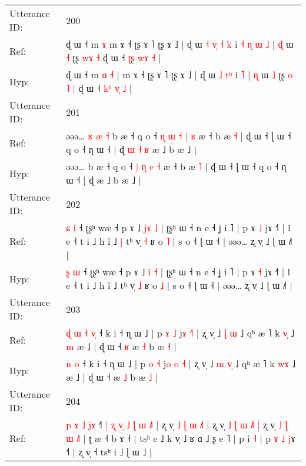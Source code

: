 \documentclass[10pt]{article}
\DeclareRobustCommand{\hl}[1]{{\textcolor{red}{#1}}}
\begin{document}
\begin{longtable}{ll}
 \\
\midrule
Utterance ID: & 200 \\
Ref: & ɖ ɯ ˧ m\hl{}\hl{}\hl{}\hl{} \hl{ɤ} m ɤ ˧ ʈʂ ɤ ˥ ʈʂ ɤ ˩ | ɖ ɯ\hl{ }\hl{˧} \hl{v}\hl{̩} \hl{˧}\hl{ }\hl{k} i\hl{ }\hl{˧}\hl{ }\hl{ɳ}\hl{ }\hl{ɯ} \hl{˩} | \hl{ɖ} ɯ \hl{˧} ʈʂ \hl{}\hl{w}\hl{ɤ} \hl{˧} ɖ ɯ ˧ \hl{ʈ}\hl{ʂ} \hl{w}\hl{ɤ} \hl{˧} |
 \\
Hyp: & ɖ ɯ ˧ m\hl{ }\hl{ɑ}\hl{ }\hl{˧} \hl{|} m ɤ ˧ ʈʂ ɤ ˥ ʈʂ ɤ ˩ | ɖ ɯ\hl{}\hl{} \hl{}\hl{˩} \hl{}\hl{t}\hl{ʰ} i\hl{}\hl{}\hl{}\hl{}\hl{}\hl{} \hl{˥} | \hl{ɳ} ɯ \hl{˩} ʈʂ \hl{o}\hl{ }\hl{˥} \hl{|} ɖ ɯ ˧ \hl{k}\hl{ʰ} \hl{v}\hl{̩} \hl{˩} |
 \\
\midrule
Utterance ID: & 201 \\
Ref: & əəə…\hl{ }\hl{ʁ}\hl{ }\hl{æ}\hl{ }\hl{˧} b æ ˧ q o ˧\hl{ }\hl{ɳ} \hl{ɯ} \hl{˧} \hl{|} \hl{ʁ} æ ˧ b æ \hl{˧} | ɖ ɯ ˧ ɭ ɯ ˧ q o ˧ ɳ ɯ ˧ | ɖ\hl{ }\hl{ɯ}\hl{ }\hl{˧}\hl{ }\hl{ʁ} æ ˩ b æ ˩ |
 \\
Hyp: & əəə…\hl{}\hl{}\hl{}\hl{}\hl{}\hl{} b æ ˧ q o ˧\hl{}\hl{} \hl{|} \hl{ɳ} \hl{e} \hl{˧} æ ˧ b æ \hl{˥} | ɖ ɯ ˧ ɭ ɯ ˧ q o ˧ ɳ ɯ ˧ | ɖ\hl{}\hl{}\hl{}\hl{}\hl{}\hl{} æ ˩ b æ ˩ |
 \\
\midrule
Utterance ID: & 202 \\
Ref: & \hl{ɕ} \hl{i} ˧ ʈʂʰ wæ ˧ p ɤ ˩ \hl{j}\hl{ɤ} \hl{˩} | ʈʂʰ ɯ ˧ n e ˧ ʝ i ˥ | p ɤ \hl{˩} jɤ ˧˥ | l e ˧ t i ˩ h ĩ ˩\hl{ }\hl{|} tʰ v̩ \hl{˧} ʁ o \hl{˥} | s o ˧ ɭ ɯ ˧ | əəə… ʐ v̩ ˩ ɭ ɯ ˩˥ |
 \\
Hyp: & \hl{ʂ} \hl{ɯ} ˧ ʈʂʰ wæ ˧ p ɤ ˩ \hl{i}\hl{̃} \hl{˧} | ʈʂʰ ɯ ˧ n e ˧ ʝ i ˥ | p ɤ \hl{˧} jɤ ˧˥ | l e ˧ t i ˩ h ĩ ˩\hl{}\hl{} tʰ v̩ \hl{˩} ʁ o \hl{˩} | s o ˧ ɭ ɯ ˧ | əəə… ʐ v̩ ˩ ɭ ɯ ˩˥ |
 \\
\midrule
Utterance ID: & 203 \\
Ref: & \hl{ɖ}\hl{ }\hl{ɯ}\hl{ }\hl{˧} \hl{v}\hl{̩} ˧ k i ˧ ɳ ɯ ˩ | p \hl{ɤ} \hl{˩} j\hl{ɤ} \hl{}\hl{˧}\hl{˥} | ʐ v̩ ˩ \hl{ɭ} \hl{}\hl{ɯ} ˩ qʰ æ ˥ k \hl{v}\hl{̩} ˩\hl{ }\hl{m} æ ˩ | ɖ ɯ ˧\hl{ }\hl{ʁ} æ \hl{˧} b æ \hl{˧} |
 \\
Hyp: & \hl{}\hl{}\hl{}\hl{}\hl{n} \hl{}\hl{o} ˧ k i ˧ ɳ ɯ ˩ | p \hl{o} \hl{˧} j\hl{o} \hl{o}\hl{ }\hl{˧} | ʐ v̩ ˩ \hl{m} \hl{v}\hl{̩} ˩ qʰ æ ˥ k \hl{w}\hl{ɤ} ˩\hl{}\hl{} æ ˩ | ɖ ɯ ˧\hl{}\hl{} æ \hl{˩} b æ \hl{˩} |
 \\
\midrule
Utterance ID: & 204 \\
Ref: & \hl{p}\hl{ }\hl{ɤ}\hl{ }\hl{˩} \hl{j}\hl{ɤ} ˧\hl{˥}\hl{ }\hl{|}\hl{ }\hl{ʐ}\hl{ }\hl{v}\hl{̩}\hl{ }\hl{˩}\hl{ }\hl{ɭ}\hl{ }\hl{ɯ}\hl{ }\hl{˩}˥ | ʐ v̩\hl{ }\hl{˩}\hl{ }\hl{ɭ}\hl{ }\hl{ɯ}\hl{ }\hl{˩}\hl{˥} \hl{|} ʐ v̩\hl{ }\hl{˩}\hl{ }\hl{ɭ}\hl{ }\hl{ɯ}\hl{ }\hl{˩}\hl{˥}\hl{ }\hl{|} ʐ v̩\hl{ }\hl{˩}\hl{ }\hl{ɭ}\hl{ }\hl{ɯ}\hl{ }\hl{˩}\hl{˥} | ʈ æ ˧ b ɤ ˧ | tsʰ e ˩ k v̩ ˩\hl{}\hl{} ʁ ɑ ˩ ʂ e ˥ | p i \hl{˧} | p\hl{ }\hl{ɤ}\hl{ }\hl{˩} \hl{j}ɤ ˧˥ | ʐ v̩ ˧ tsʰ i ˩ ɭ ɯ ˩ |

\end{longtable}
\end{document}
